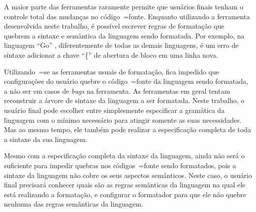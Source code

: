 {    A maior parte das ferramentas raramente permite que usuários finais tenham o controle total das mudanças no código~=fonte.
    Enquanto utilizando a ferramenta desenvolvida neste trabalho,
    é possível escrever regras de formatação que quebrem a sintaxe e
    semântica da linguagem sendo formatada.
    Por exemplo,
    na linguagem ``Go'' \cite{programmingLanguageGolang},
    diferentemente de todas as demais linguagens,
    é um erro de sintaxe adicionar a chave ``\{'' de abertura de bloco em uma linha nova.

    Utilizando~=se as ferramentas usuais de formatação,
    fica impedido que configurações do usuário quebre o código~=fonte da linguagem sendo formatada,
    a não ser em casos de \textit{bugs} na ferramenta.
    As ferramentas em geral tentam reconstruir a árvore de sintaxe da linguagem a ser formatada.
    Neste trabalho,
    o usuário final pode escolher entre simplesmente especificar a gramática da linguagem com o mínimo necessário para atingir somente as suas necessidades.
    Mas ao mesmo tempo,
    ele também pode realizar a especificação completa de toda a sintaxe da sua linguagem.

    Mesmo com a especificação completa da sintaxe da linguagem,
    ainda não será o suficiente para impedir quebras nos códigos~=fonte sendo formatados,
    pois a sintaxe da linguagem não cobre os seus aspectos semânticos.
    Neste caso,
    o usuário final precisará conhecer quais são as regras semânticas da linguagem na qual ele está realizando a formatação,
    e configurar o formatador para que ele não quebre nenhuma das regras semânticas da linguagem.
}


\section{}

